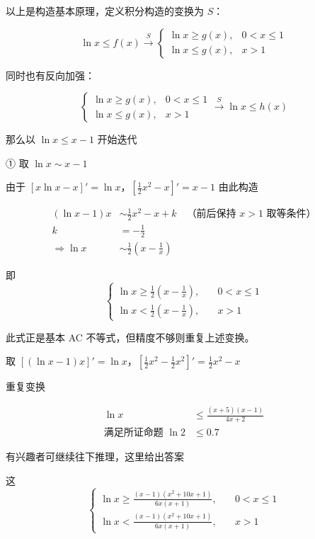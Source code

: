 \documentclass[12pt]{article}
\theoremstyle{definition}
\theoremstyle{plain}
\theoremstyle{definition}
\begin{document}
以上是构造基本原理，定义积分构造的变换为 $S$：

\[
\ln x \leq f(x) \xrightarrow{S} 
\begin{cases} 
    \ln x \geq g(x), & 0 < x \leq 1 \\
    \ln x \leq g(x), & x > 1 
\end{cases}
\]

同时也有反向加强：

\[
\begin{cases} 
    \ln x \geq g(x), & 0 < x \leq 1 \\
    \ln x \leq g(x), & x > 1 
\end{cases} 
\xrightarrow{S} \ln x \leq h(x)
\]

那么以 \(\ln x \leq x - 1\) 开始迭代

① 取 \(\ln x \sim x - 1\)

由于
\(\left\lbrack x\ln x - x \right\rbrack' = \ln x\)，\(\left\lbrack \frac{1}{2}x^{2} - x \right\rbrack' = x - 1\)
由此构造

\begin{align*}
(\ln x - 1)x &\sim \frac{1}{2}x^{2} - x + k \quad \text{（前后保持 }x > 1\text{ 取等条件）} \\
k &= -\frac{1}{2} \\
\Rightarrow \ln x &\sim \frac{1}{2}\left( x - \frac{1}{x} \right)
\end{align*}

即
\begin{equation*}
\begin{cases}
\ln x \geq \frac{1}{2}\left( x - \frac{1}{x} \right), & \quad 0 < x \leq 1 \\
\ln x < \frac{1}{2}\left( x - \frac{1}{x} \right), & \quad x > 1
\end{cases}
\end{equation*}

此式正是基本 AC 不等式，但精度不够则重复上述变换。

取
\(\left\lbrack (\ln x - 1)x \right\rbrack' = \ln x\)，\(\left\lbrack \frac{1}{2}x^{2} - \frac{1}{2}x^{2} \right\rbrack' = \frac{1}{2}x^{2} - x\)

重复变换

\begin{align*}
\ln x &\leq \frac{(x + 5)(x - 1)}{4x + 2} \\
\text{满足所证命题 } \ln 2 &\leq 0.7
\end{align*}

有兴趣者可继续往下推理，这里给出答案

这
\begin{equation*}
\begin{cases}
\ln x \geq \frac{(x - 1)\left( x^{2} + 10x + 1 \right)}{6x(x + 1)}, & \quad 0 < x \leq 1 \\
\ln x < \frac{(x - 1)\left( x^{2} + 10x + 1 \right)}{6x(x + 1)}, & \quad x > 1
\end{cases}
\end{equation*}
\end{document}
